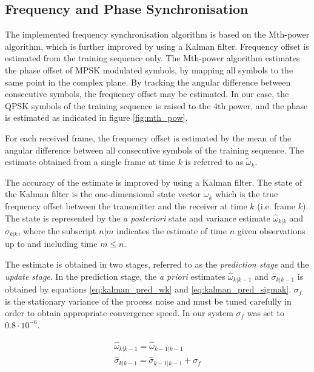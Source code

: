 \subsection{Frequency and Phase Synchronisation}
The implemented frequency synchronisation algorithm is based on the Mth-power algorithm\cite{viterbi}, which is further improved by using a Kalman filter. Frequency offset is estimated from the training sequence only. The Mth-power algorithm estimates the phase offset of MPSK modulated symbols, by mapping all symbols to the same point in the complex plane. By tracking the angular difference between consecutive symbols, the frequency offset may be estimated. In our case, the QPSK symbols of the training sequence is raised to the 4th power, and the phase is estimated as indicated in figure \ref{fig:mth_pow}.


For each received frame, the frequency offset is estimated by the mean of the angular difference between all consecutive symbols of the training sequence. The estimate obtained from a single frame at time $k$  is referred to as $\widetilde{\omega}_k$.  

The accuracy of the estimate is improved by using a Kalman filter. The state of the Kalman filter is the one-dimensional state vector $\omega_k$ which is the true frequency offset between the transmitter and the receiver at time $k$ (i.e. frame $k$). The state is represented by the \textit{a posteriori} state and variance estimate $\widehat{\omega}_{k | k}$ and $\widehat{\sigma}_{k | k}$, where the subscript $n | m$ indicates the estimate of time $n$ given observations up to and including time $m \leq n$. 

The estimate is obtained in two stages, referred to as the \textit{prediction stage} and the \textit{update stage}. In the prediction stage, the \textit{a priori} estimates $\widehat{\omega}_{k | k-1}$ and $\widehat{\sigma}_{k | k-1}$ is obtained by equations \ref{eq:kalman_pred_wk} and \ref{eq:kalman_pred_sigmak}. $\sigma_f$ is the stationary variance of the process noise and must be tuned carefully in order to obtain appropriate convergence speed. In our system $\sigma_f$ was set to $0.8\cdot 10^{-6}$.  

\begin{gather}
\widehat{\omega}_{k | k-1} = \widehat{\omega}_{k-1 | k-1}  \label{eq:kalman_pred_wk} \\
\widehat{\sigma}_{k | k-1} = \widehat{\sigma}_{k-1 | k-1} + \sigma_f \label{eq:kalman_pred_sigmak} 
\end{gather} 

